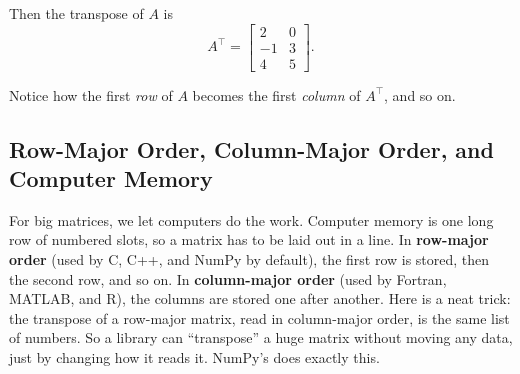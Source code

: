 Then the transpose of $A$ is
\[
A^\top =
\begin{bmatrix}
2 & 0 \\
-1 & 3 \\
4 & 5
\end{bmatrix}.
\]

Notice how the first \emph{row} of $A$ becomes the first \emph{column} of $A^\top$, and so on.

\subsection{Row-Major Order, Column-Major Order, and Computer Memory}
For big matrices, we let computers do the work. Computer memory is one long
row of numbered slots, so a matrix has to be laid out in a line. In
\textbf{row-major order} (used by C, C++, and NumPy by default), the first
row is stored, then the second row, and so on. In \textbf{column-major
order} (used by Fortran, MATLAB, and R), the columns are stored one after
another. Here is a neat trick: the transpose of a row-major matrix, read in
column-major order, is the same list of numbers. So a library can
``transpose'' a huge matrix without moving any data, just by changing how
it reads it. NumPy's  does exactly this.

